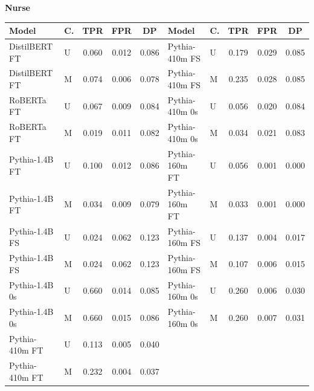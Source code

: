 \documentclass[11pt]{article}
\begin{document}
\vspace{4pt}\noindent\textbf{Nurse}
\begin{center}\scriptsize
\begin{tabular}{llccc|llccc}
\toprule
\textbf{Model} & \textbf{C.} & \textbf{TPR} & \textbf{FPR} & \textbf{DP} & \textbf{Model} & \textbf{C.} & \textbf{TPR} & \textbf{FPR} & \textbf{DP} \\
\midrule
DistilBERT FT & U & 0.060 & 0.012 & 0.086 & Pythia-410m FS & U & 0.179 & 0.029 & 0.085 \\
DistilBERT FT & M & 0.074 & 0.006 & 0.078 & Pythia-410m FS & M & 0.235 & 0.028 & 0.085 \\
RoBERTa FT & U & 0.067 & 0.009 & 0.084 & Pythia-410m 0s & U & 0.056 & 0.020 & 0.084 \\
RoBERTa FT & M & 0.019 & 0.011 & 0.082 & Pythia-410m 0s & M & 0.034 & 0.021 & 0.083 \\
Pythia-1.4B FT & U & 0.100 & 0.012 & 0.086 & Pythia-160m FT & U & 0.056 & 0.001 & 0.000 \\
Pythia-1.4B FT & M & 0.034 & 0.009 & 0.079 & Pythia-160m FT & M & 0.033 & 0.001 & 0.000 \\
Pythia-1.4B FS & U & 0.024 & 0.062 & 0.123 & Pythia-160m FS & U & 0.137 & 0.004 & 0.017 \\
Pythia-1.4B FS & M & 0.024 & 0.062 & 0.123 & Pythia-160m FS & M & 0.107 & 0.006 & 0.015 \\
Pythia-1.4B 0s & U & 0.660 & 0.014 & 0.085 & Pythia-160m 0s & U & 0.260 & 0.006 & 0.030 \\
Pythia-1.4B 0s & M & 0.660 & 0.015 & 0.086 & Pythia-160m 0s & M & 0.260 & 0.007 & 0.031 \\
Pythia-410m FT & U & 0.113 & 0.005 & 0.040 & & & & & \\
Pythia-410m FT & M & 0.232 & 0.004 & 0.037 & & & & & \\
\bottomrule
\end{tabular}
\end{center}
\end{document}
